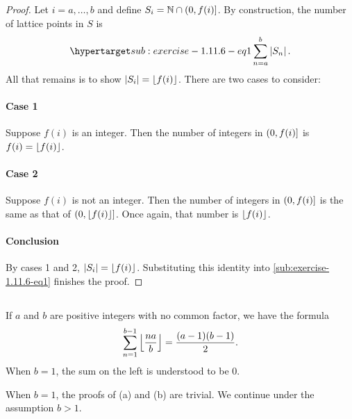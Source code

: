 \documentclass{report}
\begin{document}
  \begin{proof}

    Let $i = a, \ldots, b$ and define $S_i = \mathbb{N} \cap \left(0, f(i)\right]$.
    By construction, the number of lattice points in $S$ is
      \begin{equation}
        \hyperlabel{sub:exercise-1.11.6-eq1}
        \sum_{n = a}^b \abs{S_n}.
      \end{equation}
    All that remains is to show $\left|S_i\right| = \left\lfloor f(i)\right\rfloor$.
    There are two cases to consider:

    \paragraph{Case 1}%

      Suppose $f(i)$ is an integer.
      Then the number of integers in $\left(0, f(i)\right]$ is $f(i) = \left\lfloor f(i)\right\rfloor$.

    \paragraph{Case 2}%

      Suppose $f(i)$ is not an integer.
      Then the number of integers in $\left(0, f(i)\right]$ is the same as that of
        $\left(0, \left\lfloor f(i)\right\rfloor\right]$.
      Once again, that number is $\left\lfloor f(i)\right\rfloor$.

    \paragraph{Conclusion}%

      By cases 1 and 2, $\left|S_i\right| = \left\lfloor f(i)\right\rfloor$.
      Substituting this identity into \eqref{sub:exercise-1.11.6-eq1} finishes
        the proof.

  \end{proof}

\subsection{}%

  If $a$ and $b$ are positive integers with no common factor, we have the
    formula
    $$\sum_{n=1}^{b-1} \left\lfloor\frac{na}{b}\right\rfloor = \frac{(a - 1)(b - 1)}{2}.$$
  When $b = 1$, the sum on the left is understood to be $0$.

  \begin{note}
    When $b = 1$, the proofs of (a) and (b) are trivial.
    We continue under the assumption $b > 1$.
  \end{note}
\end{document}
